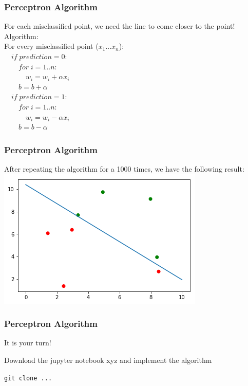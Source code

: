\begin{frame}[fragile]
  \frametitle{Perceptron Algorithm}
  For each misclassified point, we need the line to come closer to the point!\\
  \vspace{3mm}
  Algorithm:\\
  For every misclassified point ($x_1...x_n$):\\
  \vspace{2mm}
  $\quad if \; prediction = 0:$\\
  $\qquad for \; i=1..n:$\\
  $\qquad \quad w_i = w_i + \alpha x_i$\\
  $\qquad b = b + \alpha$\\
  \vspace{2mm}
  $\quad if \; prediction = 1:$\\
  $\qquad for \; i=1..n:$\\
  $\qquad \quad w_i = w_i - \alpha x_i$\\
  $\qquad b = b - \alpha$
\end{frame}

\begin{frame}[fragile]
  \frametitle{Perceptron Algorithm}
  After repeating the algorithm for a 1000 times, we have the following result:\\
  \vspace{3mm}
  \includegraphics[scale=0.4]{img/uni_data_4}
\end{frame}

\begin{frame}[fragile]
  \frametitle{Perceptron Algorithm}
  It is your turn!
  \begin{exercise}
  Download the jupyter notebook xyz and implement the algorithm
  \end{exercise}
  \verb|git clone ...|
\end{frame}

